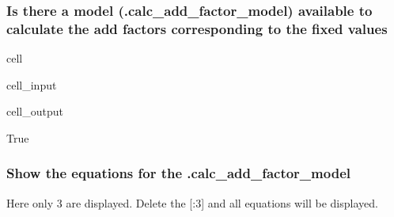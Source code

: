 \documentclass[letterpaper,10pt,english]{jupyterBook}
\begin{document}
\subsubsection{Is there a model (.calc\_add\_factor\_model) available  to calculate the add factors corresponding to the fixed values}
\label{\detokenize{content/howto/fixing/Fixing variables:is-there-a-model-calc-add-factor-model-available-to-calculate-the-add-factors-corresponding-to-the-fixed-values}}
\begin{sphinxuseclass}{cell}\begin{sphinxVerbatimInput}

\begin{sphinxuseclass}{cell_input}
\begin{sphinxVerbatim}[commandchars=\\\{\}]
\end{sphinxVerbatim}

\end{sphinxuseclass}\end{sphinxVerbatimInput}
\begin{sphinxVerbatimOutput}

\begin{sphinxuseclass}{cell_output}
\begin{sphinxVerbatim}[commandchars=\\\{\}]
True
\end{sphinxVerbatim}

\end{sphinxuseclass}\end{sphinxVerbatimOutput}

\end{sphinxuseclass}

\subsubsection{Show the equations for the .calc\_add\_factor\_model}
\label{\detokenize{content/howto/fixing/Fixing variables:show-the-equations-for-the-calc-add-factor-model}}
\sphinxAtStartPar
Here only 3 are displayed. Delete the {[}:3{]} and all equations will be displayed.
\end{document}
